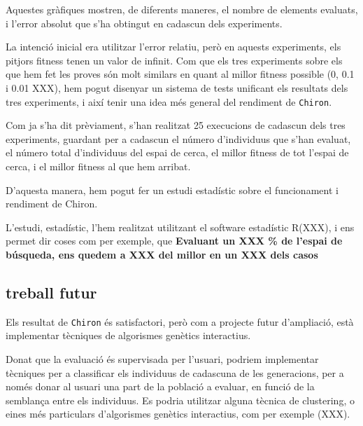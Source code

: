\documentclass[titlepage,a4paper,12pt]{book}
\begin{document}
	Aquestes gràfiques mostren, de diferents maneres, el nombre de elements
	evaluats, i l'error absolut que s'ha obtingut en cadascun dels experiments.

	La intenció inicial era utilitzar l'error relatiu, però en aquests
	experiments, els pitjors fitness tenen un valor de infinit.  Com que els
	tres experiments sobre els que hem fet les proves són molt similars en quant
	al millor fitness possible (0, 0.1 i 0.01 XXX), hem pogut disenyar un
	sistema de tests unificant els resultats dels tres experiments, i així tenir
	una idea més general del rendiment de \texttt{Chiron}.

	Com ja s'ha dit prèviament, s'han  realitzat 25 execucions de cadascun dels
	tres experiments, guardant per a cadascun el número d'individuus que s'han
	evaluat, el número total d'individuus del espai de cerca, el millor fitness
	de tot l'espai de cerca, i el millor fitness al que hem arribat.

	D'aquesta manera, hem pogut fer un estudi estadístic sobre el funcionament i
	rendiment de Chiron.

	L'estudi, estadístic, l'hem realitzat utilitzant el software estadístic
	R(XXX), i ens permet dir coses com per exemple, que \textbf{Evaluant un XXX
	\% de l'espai de búsqueda, ens quedem a XXX del millor en un XXX dels casos}


\subsection{treball futur} %
	\label{sub:treball futur}

	Els resultat de \texttt{Chiron} és satisfactori, però com a projecte futur
	d'ampliació, està implementar tècniques de algorismes genètics interactius.

	Donat que la evaluació és supervisada per l'usuari, podriem implementar
	tècniques per a classificar els individuus de cadascuna de les generacions,
	per a només donar al usuari una part de la població a evaluar, en funció de
	la semblança entre els individuus.  Es podria utilitzar alguna tècnica de
	clustering, o eines més particulars d'algorismes genètics interactius, com
	per exemple (XXX).
	
\end{document}
